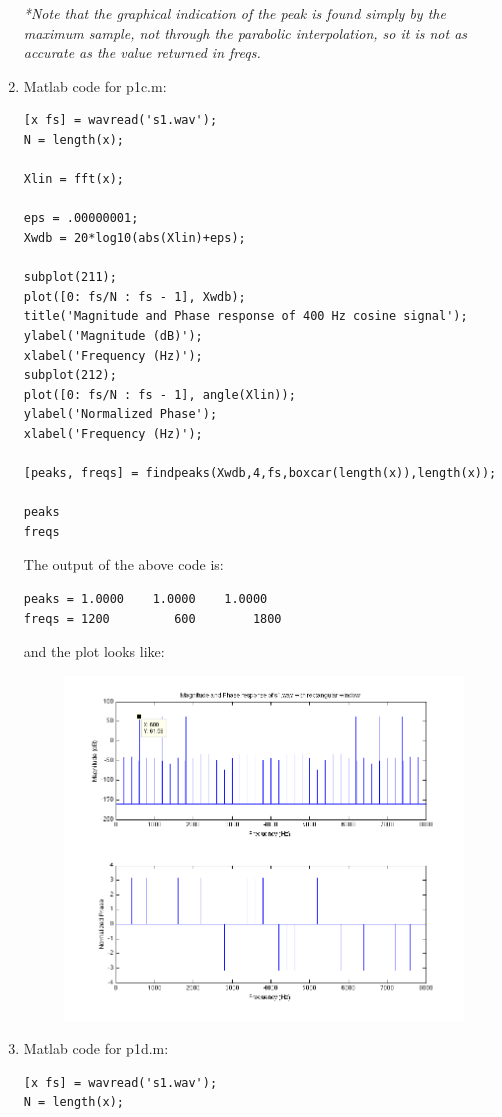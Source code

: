 \documentclass[11pt]{article}
\begin{document}
\begin{enumerate}
\emph{*Note that the graphical indication of the peak is found simply by the maximum sample, not through the parabolic interpolation, so it is not as accurate as the value returned in \emph{freqs}.}

\item  Matlab code for p1c.m:
\begin{verbatim}
[x fs] = wavread('s1.wav');
N = length(x);

Xlin = fft(x);

eps = .00000001;
Xwdb = 20*log10(abs(Xlin)+eps);

subplot(211);
plot([0: fs/N : fs - 1], Xwdb);
title('Magnitude and Phase response of 400 Hz cosine signal');
ylabel('Magnitude (dB)');
xlabel('Frequency (Hz)');
subplot(212);
plot([0: fs/N : fs - 1], angle(Xlin));
ylabel('Normalized Phase');
xlabel('Frequency (Hz)');

[peaks, freqs] = findpeaks(Xwdb,4,fs,boxcar(length(x)),length(x));

peaks
freqs
\end{verbatim}
The output of the above code is:
\begin{verbatim}
peaks = 1.0000    1.0000    1.0000
freqs = 1200         600        1800
\end{verbatim}
\newpage
and the plot looks like:
\begin{figure}[!h]
\includegraphics[scale=.7]{p1c}
\end{figure}

\newpage
\item Matlab code for p1d.m:
\begin{verbatim}
[x fs] = wavread('s1.wav');
N = length(x);


\end{verbatim}
\end{enumerate}
\end{document}
